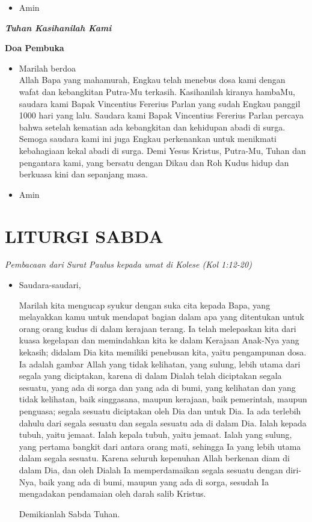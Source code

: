 \documentclass[titlepage,10pt,openany]{scrbook}
\makeatletter
\newcommand{\subjudul}[1]{%
  {\parindent \z@ 
    \interlinepenalty\@M \bfseries #1\par\nobreak \vskip 10\p@ }}
\newcommand{\lagu}[1]{%
  {\parindent \z@ 
    \interlinepenalty\@M \slshape \bfseries \normalsize \textit{#1}\par\nobreak \vskip 10\p@ }}
\newcommand{\keterangan}[1]{%
  {\parindent \z@  \slshape 
    \interlinepenalty\@M \textsl{#1}\par\nobreak  \vskip 5\p@}}
\newcommand{\BU}[1]{\begin{itemize} \item[U:] #1 \end{itemize}}
\newcommand{\BI}[1]{\begin{itemize} \item[I:] #1 \end{itemize}}
\newcommand{\BP}[1]{\begin{itemize} \item[P:] #1 \end{itemize}}
\newcommand{\namaalm}{Bapak Vincentius Fererius Parlan\xspace}
\makeatother
\begin{document}
\BU{Amin}

\lagu{Tuhan Kasihanilah Kami} 

\subjudul{Doa Pembuka}

\BI{Marilah berdoa\\
Allah Bapa yang mahamurah, Engkau telah menebus dosa 
kami dengan wafat dan kebangkitan Putra-Mu terkasih. 
Kasihanilah kiranya hambaMu, saudara kami \namaalm yang sudah Engkau panggil 1000 hari yang lalu. Saudara kami \namaalm percaya 
bahwa setelah kematian ada kebangkitan dan kehidupan abadi 
di surga. Semoga saudara kami ini juga Engkau perkenankan 
untuk menikmati kebahagiaan kekal abadi di surga. Demi 
Yesus Kristus, Putra-Mu, Tuhan dan pengantara kami, yang 
bersatu dengan Dikau dan Roh Kudus hidup dan berkuasa kini 
dan sepanjang masa. }

\BU{Amin}

 

\section*{LITURGI SABDA} 

\keterangan{Pembacaan dari Surat Paulus kepada umat di
Kolese (Kol 1:12-20)}

\BP{Saudara-saudari, 
	
	Marilah kita mengucap syukur dengan suka cita kepada 
	Bapa, yang melayakkan kamu untuk mendapat bagian dalam 
	apa yang ditentukan untuk orang orang kudus di dalam kerajaan 
	terang. Ia telah melepaskan kita dari kuasa kegelapan dan 
	memindahkan kita ke dalam Kerajaan Anak-Nya yang kekasih; 
	didalam Dia kita memiliki penebusan kita, yaitu pengampunan 
	dosa. Ia adalah gambar Allah yang tidak kelihatan, yang 
	sulung, lebih utama dari segala yang diciptakan, karena di 
	dalam Dialah telah diciptakan segala sesuatu, yang ada di sorga 
	dan yang ada di bumi, yang kelihatan dan yang tidak kelihatan, 
	baik singgasana, maupun kerajaan, baik pemerintah, maupun 
	penguasa; segala sesuatu diciptakan oleh Dia dan untuk Dia. Ia 
	ada terlebih dahulu dari segala sesuatu dan segala sesuatu ada 
	di dalam Dia. Ialah kepada tubuh, yaitu jemaat. Ialah kepala 
	tubuh, yaitu jemaat. Ialah yang sulung, yang pertama bangkit 
	dari antara orang mati, sehingga Ia yang lebih utama dalam 
	segala sesuatu. Karena seluruh kepenuhan Allah berkenan diam 
	di dalam Dia, dan oleh Dialah Ia memperdamaikan segala 
	sesuatu dengan diri-Nya, baik yang ada di bumi, maupun yang 
	ada di sorga, sesudah Ia mengadakan pendamaian oleh darah 
	salib Kristus.
	
	
Demikianlah Sabda Tuhan.}
\end{document}
